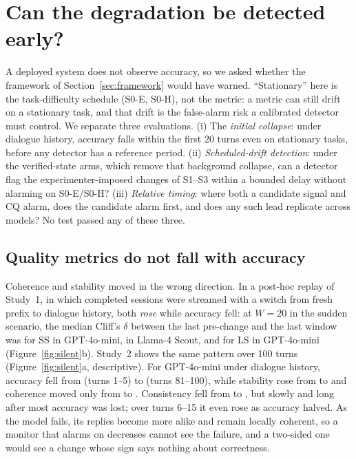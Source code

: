 \section{Can the degradation be detected early?}
\label{sec:monitoring}

A deployed system does not observe accuracy, so we asked whether the framework
of Section~\ref{sec:framework} would have warned. ``Stationary'' here is the
task-difficulty schedule (S0-E, S0-H), not the metric: a metric can still
drift on a stationary task, and that drift is the false-alarm risk a
calibrated detector must control. We separate three evaluations. (i) The
\emph{initial collapse}: under dialogue history, accuracy falls within the
first 20 turns even on stationary tasks, before any detector has a reference
period. (ii) \emph{Scheduled-drift detection}: under the verified-state arms,
which remove that background collapse, can a detector flag the
experimenter-imposed changes of S1--S3 within a bounded delay without alarming
on S0-E/S0-H? (iii) \emph{Relative timing}: where both a candidate signal and
CQ alarm, does the candidate alarm first, and does any such lead replicate
across models? No test passed any of these three.

\subsection{Quality metrics do not fall with accuracy}

Coherence and stability moved in the wrong direction. In a post-hoc replay of
Study~1, in which completed sessions were streamed with a switch from fresh
prefix to dialogue history, both \emph{rose} while accuracy fell: at $W=20$ in
the sudden scenario, the median Cliff's $\delta$ \citep{cliff1993dominance}
between the last pre-change and the last window was \replaySsDeltaGpt{} for SS
in GPT-4o-mini, \replaySsDeltaLlama{} in Llama-4 Scout, and \replayLsDeltaGpt{}
for LS in GPT-4o-mini (Figure~\ref{fig:silent}b). Study~2 shows the same
pattern over 100 turns (Figure~\ref{fig:silent}a, descriptive). For GPT-4o-mini
under dialogue history, accuracy fell from \silentCQEarly{} (turns 1--5) to
\silentCQLate{} (turns 81--100), while stability rose from \silentSSEarly{} to
\silentSSLate{} and coherence moved only from \silentLSEarly{} to
\silentLSLate{}. Consistency fell from \silentCSEarly{} to \silentCSLate{}, but
slowly and long after most accuracy was lost; over turns 6--15 it even rose as
accuracy halved. As the model fails, its replies become more alike and remain
locally coherent, so a monitor that alarms on decreases cannot see the failure,
and a two-sided one would see a change whose sign says nothing about
correctness.

